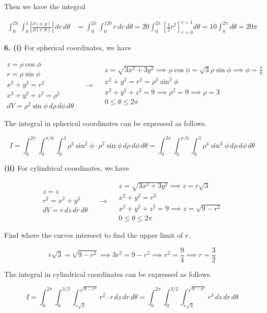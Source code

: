 \documentclass{article}
\begin{document}
Then we have the integral

\begin{align*}\int_0^{2\pi}\int_0^1\left|\frac{\partial(x,y)}{\partial(r,\theta)}\right|\,dr\,d\theta&=\int_0^{2\pi}\int_0^120r\,dr\,d\theta=20\int_0^{2\pi}\left[\frac12r^2\right]_{r=0}^{r=1}d\theta=10\int_0^{2\pi}d\theta=\boxed{20\pi}\end{align*}

\vspace{1em}

\textbf{6. (i)} For spherical coordinates, we have

\[
\begin{array}{c}
z=\rho\cos\phi\\
r=\rho\sin\phi\\
x^2+y^2=r^2\\
x^2+y^2+z^2=\rho^2\\
dV=\rho^2\sin\phi\,d\rho\,d\phi\,d\theta
\end{array}\quad\rightarrow\quad
\begin{array}{c}
\displaystyle z=\sqrt{3x^2+3y^2}\implies\rho\cos\phi=\sqrt3\rho\sin\phi\implies\phi=\frac\pi6\\[0.2cm]
x^2+y^2=r^2=\rho^2\sin^2\phi\\[0.1cm]
x^2+y^2+z^2=9\implies\rho^2=9\implies\rho=3\\[0.1cm]
0\leq\theta\leq2\pi
\end{array}
\]

The integral in spherical coordinates can be expressed as follows.

\[\boxed{{I}=\int_0^{2\pi}\int_0^{\pi/6}\int_{0}^3\rho^2\sin^2\phi\cdot\rho^2\sin\phi\,d\rho\,d\phi\,d\theta=\int_0^{2\pi}\int_0^{\pi/6}\int_{0}^3\rho^4\sin^3\phi\,d\rho\,d\phi\,d\theta}\]

\textbf{(ii)} For cylindrical coordinates, we have

\[
\begin{array}{c}
z=z\\
r^2=x^2+y^2\\
dV=r\,dz\,dr\,d\theta
\end{array}\quad\rightarrow\quad
\begin{array}{c}
z=\sqrt{3x^2+3y^2}\implies z=r\sqrt3\\[0.1cm]
x^2+y^2=r^2\\[0.1cm]
x^2+y^2+z^2=9\implies z=\sqrt{9-r^2}\\[0.1cm]
0\leq\theta\leq2\pi
\end{array}
\]

Find where the curves intersect to find the upper limit of $r$.

\[r\sqrt3=\sqrt{9-r^2}\implies3r^2=9-r^2\implies r^2=\frac94\implies r=\frac32\]

The integral in cylindrical coordinates can be expressed as follows.

\[\boxed{{I}=\int_0^{2\pi}\int_0^{3/2}\int_{r\sqrt3}^{\sqrt{9-r^2}}r^2\cdot r\,dz\,dr\,d\theta=\int_0^{2\pi}\int_0^{3/2}\int_{r\sqrt3}^{\sqrt{9-r^2}}r^3\,dz\,dr\,d\theta}\]
\end{document}
